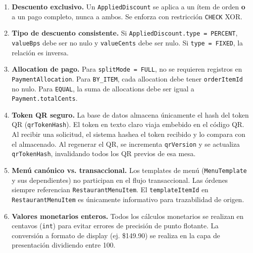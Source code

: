 \documentclass[12pt, letterpaper]{article}
\begin{document}
\begin{enumerate}
  \item \textbf{Descuento exclusivo.} Un \texttt{AppliedDiscount} se aplica a un ítem de orden \textbf{o} a un pago completo, nunca a ambos. Se enforza con restricción \texttt{CHECK} XOR.

  \item \textbf{Tipo de descuento consistente.} Si \texttt{AppliedDiscount.type = PERCENT}, \texttt{valueBps} debe ser no nulo y \texttt{valueCents} debe ser nulo. Si \texttt{type = FIXED}, la relación es inversa.

  \item \textbf{Allocation de pago.} Para \texttt{splitMode = FULL}, no se requieren registros en \texttt{PaymentAllocation}. Para \texttt{BY\_ITEM}, cada allocation debe tener \texttt{orderItemId} no nulo. Para \texttt{EQUAL}, la suma de allocations debe ser igual a \texttt{Payment.totalCents}.

  \item \textbf{Token QR seguro.} La base de datos almacena únicamente el hash del token QR (\texttt{qrTokenHash}). El token en texto claro viaja embebido en el código QR. Al recibir una solicitud, el sistema hashea el token recibido y lo compara con el almacenado. Al regenerar el QR, se incrementa \texttt{qrVersion} y se actualiza \texttt{qrTokenHash}, invalidando todos los QR previos de esa mesa.

  \item \textbf{Menú canónico vs. transaccional.} Los templates de menú (\texttt{MenuTemplate} y sus dependientes) no participan en el flujo transaccional. Las órdenes siempre referencian \texttt{RestaurantMenuItem}. El \texttt{templateItemId} en \texttt{RestaurantMenuItem} es únicamente informativo para trazabilidad de origen.

  \item \textbf{Valores monetarios enteros.} Todos los cálculos monetarios se realizan en centavos (\texttt{int}) para evitar errores de precisión de punto flotante. La conversión a formato de display (ej. \$149.90) se realiza en la capa de presentación dividiendo entre 100.

\end{enumerate}
\end{document}
